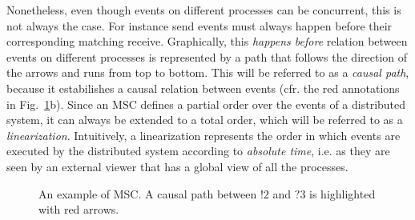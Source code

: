 Nonetheless, even though events on different processes can be concurrent, this is not always the case. For instance send events must always happen before their corresponding matching receive. Graphically, this \emph{happens before} relation between events on different processes is represented by a path that follows the direction of the arrows and runs from top to bottom. This will be referred to as a \emph{causal path}, because it estabilishes a causal relation between events (cfr. the red annotations in  Fig.~\ref{fig:msc_ex}b). 
Since an MSC defines a partial order over the events of a distributed system, it can always be extended to a total order, which will be referred to as a \emph{linearization}. 
Intuitively, a linearization represents the order in which events are executed by the distributed system according to \emph{absolute time}, i.e. as they are seen by an external viewer that has a global view of all the processes. 

\begin{figure}[t]
	\begin{center}
		\caption{An example of MSC. A causal path between $!2$ and $?3$ is highlighted with red arrows.}
		\label{fig:msc_ex}
	\end{center}
\end{figure}

